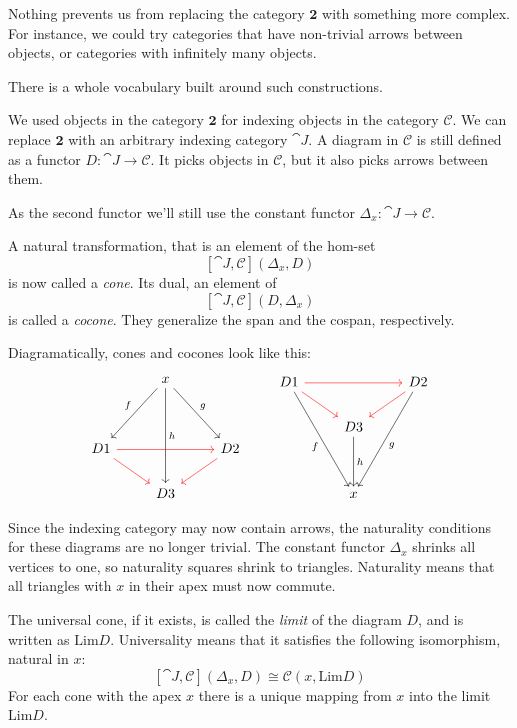 \documentclass[DaoFP]{subfiles}
\begin{document}
Nothing prevents us from replacing the category $\mathbf{2}$ with something more complex. For instance, we could try categories that have non-trivial arrows between objects, or categories with infinitely many objects. 

There is a whole vocabulary built around such constructions. 

We used objects in the category $\mathbf{2}$ for indexing objects in the category $\mathcal{C}$. We can replace $\mathbf{2}$ with an arbitrary indexing category $\cat J$. A diagram in $\mathcal{C}$ is still defined as a functor $D \colon \cat J \to \mathcal{C}$. It picks objects in $\mathcal{C}$, but it also picks arrows between them.

As the second functor we'll still use the constant functor $\Delta_x \colon \cat J \to \mathcal{C}$.

A  natural transformation, that is an element of the hom-set
\[ [\cat J, \mathcal{C}](\Delta_x, D)  \]
is now called a \emph{cone}. Its dual, an element of
\[ [\cat J, \mathcal{C}](D, \Delta_x)  \]
is called a \emph{cocone}. They generalize the span and the cospan, respectively.

Diagramatically, cones and cocones look like this:
\[
 \begin{tikzcd}
  & x
\arrow[ddr, "g"]
 \arrow[ddl, "f"']
 \arrow[ddd, "h"]
 \\
\\
D 1 
\arrow[rr, red]
\arrow[rd, red]
&& D 2
\arrow[dl, red]
\\
& D 3
 \end{tikzcd}
 \qquad
\begin{tikzcd}
 D 1
 \arrow[rr, red]
 \arrow[dr, red]
 \arrow[dddr, "f"']
 && D 2
\arrow[dl, red]
 \arrow[dddl, "g"]
 \\
 & D 3
 \arrow[dd, "h"]
 \\
 \\
 & x
 \end{tikzcd}
 \]

Since the indexing category may now contain arrows, the naturality conditions for these diagrams are no longer trivial. The constant functor $\Delta_x$ shrinks all vertices to one, so naturality squares shrink to triangles. Naturality means that all triangles with $x$ in their apex must now commute. 

The universal cone, if it exists, is called the \emph{limit} of the diagram $D$, and is written as $\text{Lim}D$. Universality means that it satisfies the following isomorphism, natural in $x$:
\[ [\cat J, \mathcal{C}](\Delta_x, D)  \cong \mathcal{C}(x, \text{Lim}D) \]
For each cone with the apex $x$ there is a unique mapping from $x$ into the limit $ \text{Lim}D$.
\end{document}

